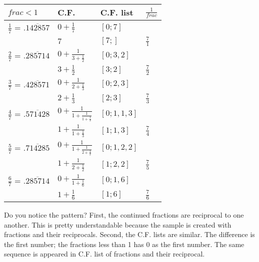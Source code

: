 \documentclass{jreport}
\begin{document}
\begin{table}[htbp]
\begin{center}
\begin{tabular}{|l|l|l|l|}
\hline
$frac<1$ & C.F. & C.F. list & $\frac{1}{frac}$\\
\hline
$\frac{1}{7}$ = $.\overline{142857}$ & $0+\frac{1}{7}$ & $[0;7]$ &\\
 & $7$ & $[7;]$ & $\frac{7}{1}$\\
\hline
$\frac{2}{7}$ = $.\overline{285714}$ & $0+\frac{1}{3+\frac{1}{2}}$ & $[0;3,2]$ &\\
 & $3+\frac{1}{2}$ & $[3;2]$ & $\frac{7}{2}$\\
\hline
$\frac{3}{7}$ = $.\overline{428571}$ & $0+\frac{1}{2+\frac{1}{3}}$ & $[0;2,3]$ &\\
 & $2+\frac{1}{3}$ & $[2;3]$ & $\frac{7}{3}$\\
\hline
$\frac{4}{7}$ = $.\overline{571428}$ & $0+\frac{1}{1+\frac{1}{1+\frac{1}{3}}}$ & $[0;1,1,3]$ &\\
 & $1+\frac{1}{1+\frac{1}{3}}$ & $[1;1,3]$ & $\frac{7}{4}$\\
\hline
$\frac{5}{7}$ = $.\overline{714285}$ & $0+\frac{1}{1+\frac{1}{2+\frac{1}{2}}}$ & $[0;1,2,2]$ &\\
 & $1+\frac{1}{2+\frac{1}{2}}$ & $[1;2,2]$ & $\frac{7}{5}$\\
\hline
$\frac{6}{7}$ = $.\overline{285714}$ & $0+\frac{1}{1+\frac{1}{6}}$ & $[0;1,6]$ & \\
 & $1+\frac{1}{6}$ & $[1;6]$ & $\frac{7}{6}$\\
\hline
\end{tabular}
\end{center}
\end{table}

Do you notice the pattern? First, the continued fractions are reciprocal to one another. This is pretty understandable because the sample is created with fractions and their reciprocals. Second, the C.F. lists are similar. The difference is the first number; the fractions less than 1 has 0 as the first number. The same sequence is appeared in C.F. list of fractions and their reciprocal.
\end{document}
